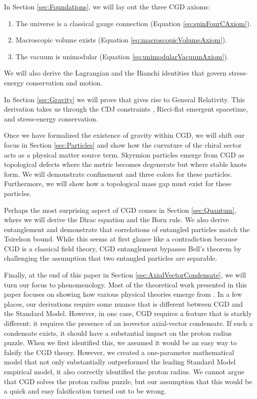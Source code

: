 In Section \ref{sec:Foundations}, we will lay out the three CGD axioms:
\begin{enumerate}[label=\textbf{Axiom \arabic*:}, ref=\arabic*, labelindent=\parindent, leftmargin=*]
    \item \label{ax:spinFourCAxiom} The universe is a classical \spinFourC gauge connection (Equation \ref{eq:spinFourCAxiom}).
    \item \label{ax:macroscopicVolumeAxiom} Macroscopic volume exists (Equation \ref{eq:macroscopicVolumeAxiom}).
    \item \label{ax:unimodularVacuumAxiom} The vacuum is unimodular (Equation \ref{eq:unimodularVacuumAxiom}).
\end{enumerate}
\noindent We will also derive the Lagrangian and the Bianchi identities that govern stress-energy conservation and motion.

In Section \ref{sec:Gravity} we will prove that \spinFourC gives rise to General Relativity. This derivation takes us through the CDJ constraints \citep{capovilla1991pure}, Ricci-flat emergent spacetime, and stress-energy conservation.

Once we have formalized the existence of gravity within CGD, we will shift our focus in Section \ref{sec:Particles} and show how the curvature of the \slTwoCR chiral sector acts as a physical matter source term. Skyrmion particles \citep{skyrme1962unified} emerge from CGD as topological defects where the metric becomes degenerate but where stable knots form. We will demonstrate confinement and three colors for these particles. Furthermore, we will show how a topological mass gap must exist for these particles.

Perhaps the most surprising aspect of CGD comes in Section \ref{sec:Quantum}, where we will derive the Dirac equation and the Born rule. We also derive entanglement and demonstrate that correlations of entangled particles match the Tsirelson bound. While this seems at first glance like a contradiction because CGD is a classical field theory, CGD entanglement bypasses Bell's theorem by challenging the assumption that two entangled particles are separable.

Finally, at the end of this paper in Section \ref{sec:AxialVectorCondensate}, we will turn our focus to phenomenology. Most of the theoretical work presented in this paper focuses on showing how various physical theories emerge from \spinFourC. In a few places, our derivations require some nuance that is different between CGD and the Standard Model. However, in onc case, CGD requires a feature that is starkly different: it requires the presence of an isovector axial-vector condensate. If such a condensate exists, it should have a substantial impact on the proton radius puzzle. When we first identified this, we assumed it would be an easy way to falsify the CGD theory. However, we created a one-parameter mathematical model that not only substantially outperformed the leading Standard Model empirical model, it also correctly identified the proton radius. We cannot argue that CGD solves the proton radius puzzle, but our assumption that this would be a quick and easy falsification turned out to be wrong.

